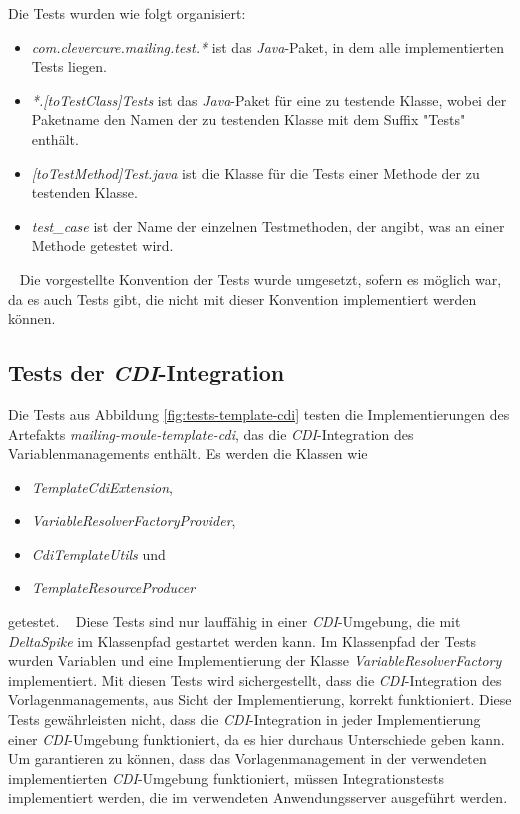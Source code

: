 \newline
\newline
Die Tests wurden wie folgt organisiert:
\begin{itemize}
	\item\emph{com.clevercure.mailing.test.*} ist das \emph{Java}-Paket, in dem alle implementierten Tests liegen. 
	\item\emph{*.[toTestClass]Tests} ist das \emph{Java}-Paket für eine zu testende Klasse, wobei der Paketname den Namen der zu testenden Klasse mit dem Suffix "Tests" enthält.
	\item\emph{[toTestMethod]Test.java} ist die Klasse für die Tests einer Methode der zu testenden Klasse.
	\item\emph{test\_case} ist der Name der einzelnen Testmethoden, der angibt, was an einer Methode getestet wird. 
\end{itemize}
\ \newline
Die vorgestellte Konvention der Tests wurde umgesetzt, sofern es möglich war, da es auch Tests gibt, die nicht mit dieser Konvention implementiert werden können.

\subsection{Tests der \emph{CDI}-Integration}
Die Tests aus Abbildung \ref{fig:tests-template-cdi} testen die Implementierungen des Artefakts \emph{mailing-moule-template-cdi}, das die \emph{CDI}-Integration des Variablenmanagements enthält. Es werden die Klassen wie
\begin{itemize}
	\item \emph{TemplateCdiExtension},
	\item \emph{VariableResolverFactoryProvider},
	\item \emph{CdiTemplateUtils} und 
	\item \emph{TemplateResourceProducer}
\end{itemize}
getestet.
\ \newline
Diese Tests sind nur lauffähig in einer \emph{CDI}-Umgebung, die mit \emph{DeltaSpike} im Klassenpfad gestartet werden kann. Im Klassenpfad der Tests wurden Variablen und eine Implementierung der Klasse \emph{VariableResolverFactory} implementiert. Mit diesen Tests wird sichergestellt, dass die \emph{CDI}-Integration des Vorlagenmanagements, aus Sicht der Implementierung, korrekt funktioniert. Diese Tests gewährleisten nicht, dass die \emph{CDI}-Integration in jeder Implementierung einer \emph{CDI}-Umgebung funktioniert, da es hier durchaus Unterschiede geben kann. Um garantieren zu können, dass das Vorlagenmanagement in der verwendeten implementierten \emph{CDI}-Umgebung funktioniert, müssen Integrationstests implementiert werden, die im verwendeten Anwendungsserver ausgeführt werden.
\newpage

